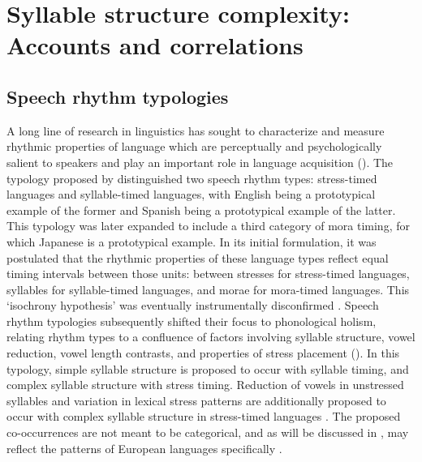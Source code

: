 \section{Syllable structure complexity: Accounts and correlations}\label{sec:1.3}
\subsection{Speech rhythm typologies}\label{sec:1.3.1}

  A long line of research in linguistics has sought to characterize and measure rhythmic properties of language which are perceptually and psychologically salient to speakers and play an important role in language acquisition (\citealt{CutlerMehler1993}). The typology proposed by \citet{Pike1945} distinguished two speech rhythm types: stress-timed languages and syllable-timed languages, with English being a prototypical example of the former and Spanish being a prototypical example of the latter. This typology was later expanded to include a third category of mora timing, for which Japanese is a prototypical example. In its initial formulation, it was postulated that the rhythmic properties of these language types reflect equal timing intervals between those units: between stresses for stress-timed languages, syllables for syllable-timed languages, and morae for mora-timed languages. This ‘isochrony hypothesis’ was eventually instrumentally disconfirmed \citep{Roach1982}. Speech rhythm typologies subsequently shifted their  focus to phonological holism, relating rhythm types to a confluence of factors involving syllable structure, vowel reduction, vowel length contrasts, and properties of stress placement (\citealt{Roach1982,Dauer1983}). In this typology, simple syllable structure is proposed to occur with syllable timing, and complex syllable structure with stress timing. Reduction of vowels in unstressed syllables and variation in lexical stress patterns are additionally proposed to occur with complex syllable structure in stress-timed languages \citep{Auer1993}. The proposed co-occurrences are not meant to be categorical, and as will be discussed in , may reflect the patterns of European languages specifically \citep{Schiering2007}.

